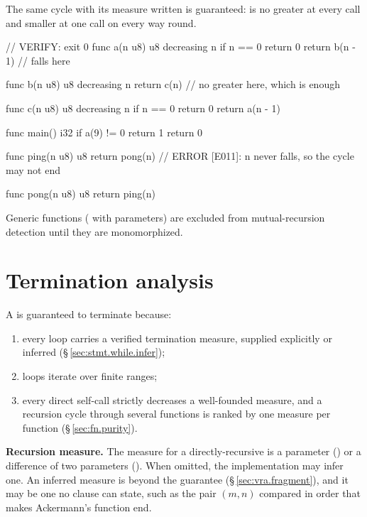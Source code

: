 The same cycle with its measure written is guaranteed:  is no greater at every call
and smaller at one call on every way round.

\begin{laincode}
// VERIFY: exit 0
func a(n u8) u8 decreasing n {
    if n == 0 { return 0 }
    return b(n - 1)              // falls here
}

func b(n u8) u8 decreasing n {
    return c(n)                  // no greater here, which is enough
}

func c(n u8) u8 decreasing n {
    if n == 0 { return 0 }
    return a(n - 1)
}

func main() i32 {
    if a(9) != 0 { return 1 }
    return 0
}
\end{laincode}

\begin{laincode}
func ping(n u8) u8 {
    return pong(n)               // ERROR [E011]: n never falls, so the cycle may not end
}

func pong(n u8) u8 {
    return ping(n)
}
\end{laincode}

\begin{note}
  Generic functions ( with  parameters) are
  excluded from mutual-recursion detection until they are monomorphized.
\end{note}

\section{Termination analysis}
\label{sec:fn.termination}

\pnum
A  is guaranteed to terminate because:
\begin{enumerate}
  \item every  loop carries a verified termination measure,
        supplied explicitly or inferred (\S\,\ref{sec:stmt.while.infer});
  \item {} loops iterate over finite ranges;
  \item every direct self-call strictly decreases a well-founded measure, and a
        recursion cycle through several functions is ranked by one measure per function
        (\S\,\ref{sec:fn.purity}).
\end{enumerate}

\pnum
\textbf{Recursion measure.}  The measure for a directly-recursive 
is a parameter () or a difference of two parameters
().  When omitted, the implementation may infer one.  An inferred
measure is beyond the guarantee (\S\,\ref{sec:vra.fragment}), and it may be one no
 clause can state, such as the pair $(m, n)$ compared in order that makes
Ackermann's function end.

